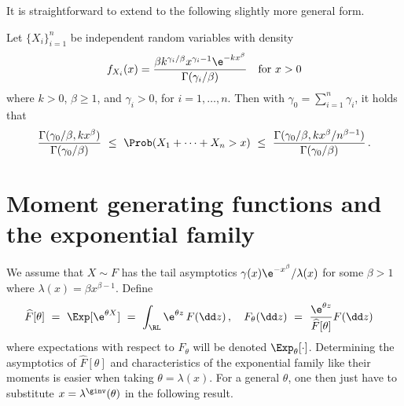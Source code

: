 It is straightforward to extend  to the following slightly more general form.
\begin{proposition}\label{Prop:24.1b} Let $\{X_i\}_{i=1}^n$ be independent random variables with
density
\[ f_{X_i}(x) = \frac{ \beta k^{\gamma_i/\beta} x^{\gamma_i-1}\e^{-kx^\beta} } { \Gamma(\gamma_i/\beta) } \quad \text{for }x>0 \]
where $k>0$, $\beta\geq 1$, and $\gamma_i>0$, for $i=1,\dots,n$. Then with $\gamma_0=\sum_{i=1}^n \gamma_i$, it holds that
\[ \frac{\Gamma(\gamma_0/\beta,kx^\beta)}{\Gamma(\gamma_0/\beta)}
\ \le\ \Prob(X_1 + \cdots + X_n > x)\ \le \
\frac{\Gamma(\gamma_0/\beta,kx^\beta/n^{\beta-1})}{\Gamma(
\gamma_0/\beta)}\,.\]
\end{proposition}


\section{Moment generating functions and the exponential family}\label{S:ExpFam}

We assume that $X \sim F$ has the tail asymptotics $\gamma(x)\e^{-x^\beta}/\lambda(x)$ for some $\beta>1$ where $\lambda(x)=\beta x^{\beta-1}$.
Define
\begin{align*}
\widehat F[\theta]\ &=\ \Exp [\e^{\theta X}]\ =\
\int_{\RL}  \e^{\theta z}\, F(\dd z)\,,\quad
F_\theta(\dd z)\ =\ \frac{\e^{\theta z}}{\widehat F[\theta]}F(\dd z)
\end{align*}
where expectations with respect to $F_\theta$ will be denoted $\Exp_\theta[\cdot]$.
Determining the asymptotics of $\widehat F[\theta]$ and characteristics of the exponential family
like their moments is easier when taking $\theta=\lambda(x)$. For a general $\theta$, one then
just have to substitute $x=\lambda^{\ginv}(\theta)$ in the following result.

